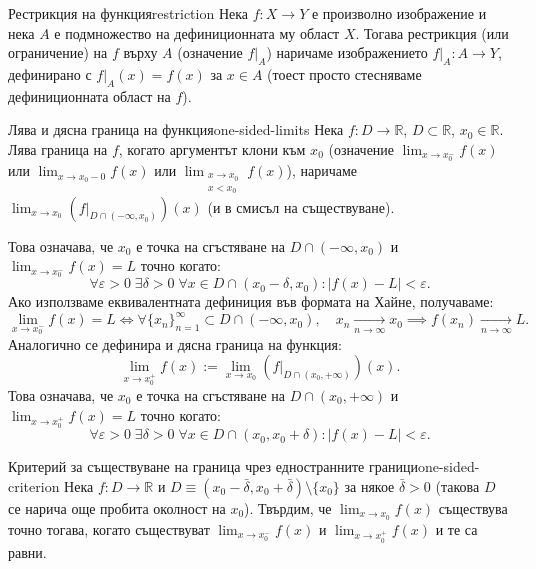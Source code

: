 \begin{definition}{Рестрикция на функция}{restriction}
Нека $f : X \to Y$ е произволно изображение и нека $A$ е подмножество на дефиниционната му област $X$. Тогава рестрикция (или ограничение) на $f$ върху $A$ (означение $f|_A$) наричаме изображението $f|_A : A \to Y$, дефинирано с $f|_A(x) = f(x)$ за $x \in A$ (тоест просто стесняваме дефиниционната област на $f$).
\end{definition}

\begin{definition}{Лява и дясна граница на функция}{one-sided-limits}
Нека $f : D \to \mathbb{R}$, $D \subset \mathbb{R}$, $x_0 \in \mathbb{R}$. Лява граница на $f$, когато аргументът клони към $x_0$ (означение $\lim_{x \to x_0^-} f(x)$ или $\lim_{x \to x_0 - 0} f(x)$ или $\lim_{\substack{x \to x_0 \\ x < x_0}} f(x)$), наричаме $\lim_{x \to x_0} \left( f|_{D \cap (-\infty, x_0)} \right)(x)$ (и в смисъл на съществуване).

Това означава, че $x_0$ е точка на сгъстяване на $D \cap (-\infty, x_0)$ и $\lim_{x \to x_0^-} f(x) = L$ точно когато:
\[
\forall \varepsilon > 0 \; \exists \delta > 0 \; \forall x \in D \cap (x_0 - \delta, x_0) : |f(x) - L| < \varepsilon.
\]
Ако използваме еквивалентната дефиниция във формата на Хайне, получаваме:
\[
\lim_{x \to x_0^-} f(x) = L \iff \forall \{x_n\}_{n=1}^{\infty} \subset D \cap (-\infty, x_0), \quad x_n \xrightarrow[n \to \infty]{} x_0 \implies f(x_n) \xrightarrow[n \to \infty]{} L.
\]
Аналогично се дефинира и дясна граница на функция:
\[
\lim_{x \to x_0^+} f(x) := \lim_{x \to x_0} \left( f|_{D \cap (x_0, +\infty)} \right)(x).
\]
Това означава, че $x_0$ е точка на сгъстяване на $D \cap (x_0, +\infty)$ и $\lim_{x \to x_0^+} f(x) = L$ точно когато:
\[
\forall \varepsilon > 0 \; \exists \delta > 0 \; \forall x \in D \cap (x_0, x_0 + \delta) : |f(x) - L| < \varepsilon.
\]
\end{definition}

\begin{theorem}{Критерий за съществуване на граница чрез едностранните граници}{one-sided-criterion}
Нека $f : D \to \mathbb{R}$ и $D \equiv (x_0 - \bar{\delta}, x_0 + \bar{\delta}) \setminus \{x_0\}$ за някое $\bar{\delta} > 0$ (такова $D$ се нарича още пробита околност на $x_0$). Твърдим, че $\lim_{x \to x_0} f(x)$ съществува точно тогава, когато съществуват $\lim_{x \to x_0^-} f(x)$ и $\lim_{x \to x_0^+} f(x)$ и те са равни.
\end{theorem}

